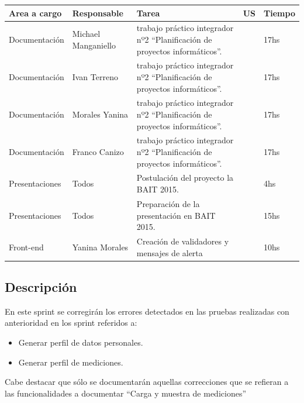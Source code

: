 \documentclass[a4paper,12pt]{article}
\begin{document}
	{\scriptsize
	\begin{center} %
	\centering
    \resizebox{\textwidth}{!}
    {
	\begin{tabular}{|l|l|p{5cm}|l|l|}
	    \hline
	        \textbf{Area a cargo} &
	        \textbf{Responsable} &        
	        \textbf{Tarea} &
	        \textbf{US} &
            \textbf{Tiempo}\\
   		\hline
       
	    Documentación& Michael Manganiello & trabajo práctico integrador nº2 ``Planificación de proyectos informáticos''. & & 17hs \\ \hline
        Documentación& Ivan Terreno & trabajo práctico integrador nº2 ``Planificación de proyectos informáticos''. & & 17hs \\ \hline
        Documentación& Morales Yanina & trabajo práctico integrador nº2 ``Planificación de proyectos informáticos''. & & 17hs \\ \hline
        Documentación& Franco Canizo & trabajo práctico integrador nº2 ``Planificación de proyectos informáticos''. & & 17hs \\ \hline
        Presentaciones& Todos & Postulación del proyecto la BAIT 2015. & & 4hs \\ \hline
        Presentaciones& Todos & Preparación de la presentación en BAIT 2015. & & 15hs \\ \hline        
	    Front-end& Yanina Morales & Creación de validadores y mensajes de alerta & & 10hs\\ \hline             
	    \end{tabular}
        }
    	\end{center}
	}


\subsection{Descripción}
En este sprint se corregirán los errores detectados en las pruebas realizadas con anterioridad en los sprint referidos a:
    \begin{itemize}
    \item Generar perfil de datos personales.
    \item Generar  perfil de mediciones.
    \end{itemize}
Cabe destacar que sólo se documentarán aquellas correcciones que se refieran a las funcionalidades a documentar ``Carga y muestra de mediciones''
\end{document}
